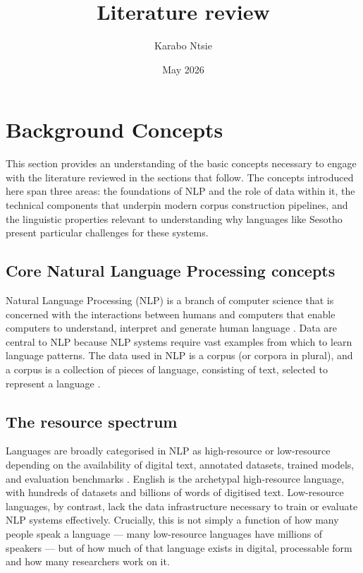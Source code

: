 \documentclass[11pt,a4paper]{article}
\begin{document}
	
\title{Literature review }
\author{ Karabo Ntsie }
\date {May 2026}
\maketitle

\section{Background Concepts}
This section provides an understanding of the basic concepts necessary to engage with the literature reviewed in the sections that follow. The concepts introduced here span three areas: the foundations of NLP and the role of data within it, the technical components that underpin modern corpus construction pipelines, and the linguistic properties relevant to understanding why languages like Sesotho present particular challenges for these systems.

\subsection{Core Natural Language Processing concepts}
Natural Language Processing (NLP) is a branch of computer science that is concerned with the interactions between humans and computers that enable computers to understand, interpret and generate human language \citep{reshamwala2013review}. Data are central to NLP because NLP systems require vast examples from which to learn language patterns. The data used in NLP is a corpus (or corpora in plural), and a corpus is a collection of pieces of language, consisting of text, selected to represent a language \citep{yakut2022basics}. 

\subsection{The resource spectrum}
Languages are broadly categorised in NLP as high-resource or low-resource depending on the availability of digital text, annotated datasets, trained models, and evaluation benchmarks \citep{shahid2025think}. English is the archetypal high-resource language, with hundreds of datasets and billions of words of digitised text. Low-resource languages, by contrast, lack the data infrastructure necessary to train or evaluate NLP systems effectively. Crucially, this is not simply a function of how many people speak a language — many low-resource languages have millions of speakers — but of how much of that language exists in digital, processable form and how many researchers work on it.
\end{document}
